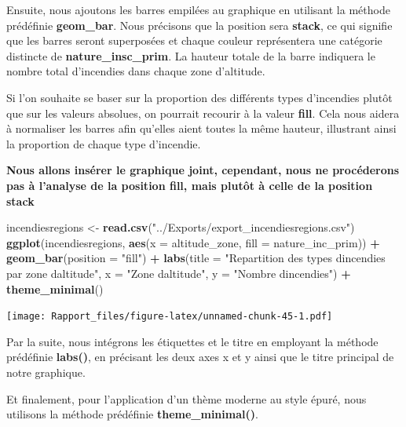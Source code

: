 \documentclass[
]{article}
\newenvironment{Shaded}{\begin{snugshade}}{\end{snugshade}}
\newcommand{\AttributeTok}[1]{\textcolor[rgb]{0.13,0.29,0.53}{#1}}
\newcommand{\FunctionTok}[1]{\textcolor[rgb]{0.13,0.29,0.53}{\textbf{#1}}}
\newcommand{\NormalTok}[1]{#1}
\newcommand{\OtherTok}[1]{\textcolor[rgb]{0.56,0.35,0.01}{#1}}
\newcommand{\SpecialCharTok}[1]{\textcolor[rgb]{0.81,0.36,0.00}{\textbf{#1}}}
\newcommand{\StringTok}[1]{\textcolor[rgb]{0.31,0.60,0.02}{#1}}
\begin{document}
Ensuite, nous ajoutons les barres empilées au graphique en utilisant la
méthode prédéfinie \textbf{geom\_bar}. Nous précisons que la position
sera \textbf{stack}, ce qui signifie que les barres seront superposées
et chaque couleur représentera une catégorie distincte de
\textbf{nature\_insc\_prim}. La hauteur totale de la barre indiquera le
nombre total d'incendies dans chaque zone d'altitude.

Si l'on souhaite se baser sur la proportion des différents types
d'incendies plutôt que sur les valeurs absolues, on pourrait recourir à
la valeur \textbf{fill}. Cela nous aidera à normaliser les barres afin
qu'elles aient toutes la même hauteur, illustrant ainsi la proportion de
chaque type d'incendie.

\textbf{Nous allons insérer le graphique joint, cependant, nous ne
procéderons pas à l'analyse de la position fill, mais plutôt à celle de
la position stack}

\begin{Shaded}
\begin{Highlighting}[]
\NormalTok{incendiesregions }\OtherTok{\textless{}{-}} \FunctionTok{read.csv}\NormalTok{(}\StringTok{"../Exports/export\_incendiesregions.csv"}\NormalTok{)}
\FunctionTok{ggplot}\NormalTok{(incendiesregions, }\FunctionTok{aes}\NormalTok{(}\AttributeTok{x =}\NormalTok{ altitude\_zone, }\AttributeTok{fill =}\NormalTok{ nature\_inc\_prim)) }\SpecialCharTok{+}
  \FunctionTok{geom\_bar}\NormalTok{(}\AttributeTok{position =} \StringTok{"fill"}\NormalTok{) }\SpecialCharTok{+}
  \FunctionTok{labs}\NormalTok{(}\AttributeTok{title =} \StringTok{"Repartition des types d\textquotesingle{}incendies par zone d\textquotesingle{}altitude"}\NormalTok{,}
       \AttributeTok{x =} \StringTok{"Zone d\textquotesingle{}altitude"}\NormalTok{, }\AttributeTok{y =} \StringTok{"Nombre d\textquotesingle{}incendies"}\NormalTok{) }\SpecialCharTok{+}
  \FunctionTok{theme\_minimal}\NormalTok{()}
\end{Highlighting}
\end{Shaded}

\texttt{[image: Rapport\_files/figure-latex/unnamed-chunk-45-1.pdf]}

Par la suite, nous intégrons les étiquettes et le titre en employant la
méthode prédéfinie \textbf{labs()}, en précisant les deux axes x et y
ainsi que le titre principal de notre graphique.

Et finalement, pour l'application d'un thème moderne au style épuré,
nous utilisons la méthode prédéfinie \textbf{theme\_minimal()}.
\end{document}
